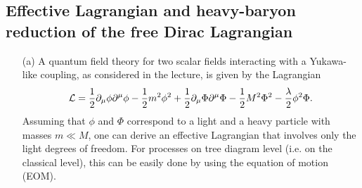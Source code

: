 \documentclass[11pt]{latex/exercise}
\begin{document}
\subsection{Effective Lagrangian and heavy-baryon reduction of the free Dirac Lagrangian}
\noindent
\begin{itemize}
    \item[(a)] A quantum field theory for two scalar fields interacting with a Yukawa-like coupling, as considered in the lecture, is given by the Lagrangian
          \begin{gather}
              \mathcal{L}=
              \frac{1}{2}\partial_{\mu}\phi\partial^{\mu}\phi
              -\frac{1}{2}m^2\phi^2
              +\frac{1}{2}\partial_{\mu}\Phi\partial^{\mu}\Phi
              -\frac{1}{2}M^2\Phi^2
              -\frac{\lambda}{2}\phi^2\Phi.
              \label{eq:Leff}
          \end{gather}
          Assuming that $\phi$ and $\Phi$ correspond to a light and a heavy particle with masses $m\ll M$, one can derive an effective Lagrangian that involves only the light degrees of freedom. For processes on tree diagram level (i.e. on the classical level), this can be easily done by using the equation of motion (EOM).


\end{itemize}
\end{document}
